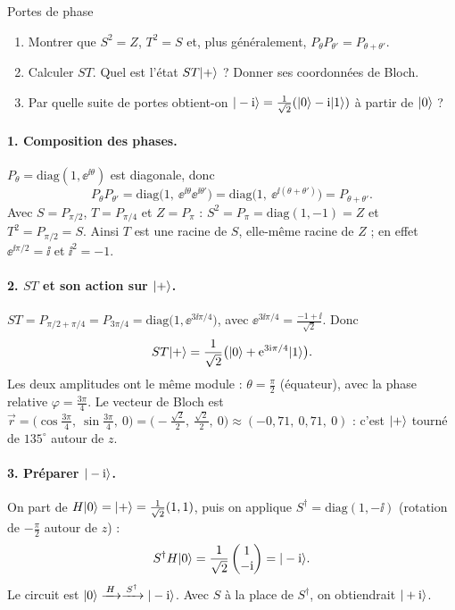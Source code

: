 \begin{exercice}{Portes de phase}\label{ex:phases}
\begin{enumerate}[label=\arabic*.,nosep]
  \item Montrer que $S^2=Z$, $T^2=S$ et, plus généralement, $P_\theta P_{\theta'}=P_{\theta+\theta'}$.
  \item Calculer $ST$. Quel est l'état $ST|+\rangle$ ? Donner ses coordonnées de Bloch.
  \item Par quelle suite de portes obtient-on $|-\mathrm{i}\rangle=\frac{1}{\sqrt2}(|0\rangle-\mathrm{i}|1\rangle)$ à partir
        de $|0\rangle$ ?
\end{enumerate}
\end{exercice}
\begin{correction}
\paragraph{1. Composition des phases.} $P_\theta=\mathrm{diag}(1,\ee^{\ii\theta})$ est diagonale, donc
\[
  P_\theta P_{\theta'}=\mathrm{diag}\big(1,\ \ee^{\ii\theta}\ee^{\ii\theta'}\big)=\mathrm{diag}\big(1,\ \ee^{\ii(\theta+\theta')}\big)
  =P_{\theta+\theta'} .
\]
Avec $S=P_{\pi/2}$, $T=P_{\pi/4}$ et $Z=P_\pi$ : $S^2=P_\pi=\mathrm{diag}(1,-1)=Z$ et
$T^2=P_{\pi/2}=S$. Ainsi $T$ est une racine de $S$, elle-même racine de $Z$ ; en effet
$\ee^{\ii\pi/2}=\ii$ et $\ii^2=-1$.

\paragraph{2. $ST$ et son action sur $|+\rangle$.} $ST=P_{\pi/2+\pi/4}=P_{3\pi/4}
=\mathrm{diag}\big(1,\ee^{3\ii\pi/4}\big)$, avec $\ee^{3\ii\pi/4}=\frac{-1+\ii}{\sqrt2}$. Donc
\[
  ST|+\rangle=\frac{1}{\sqrt2}\big(|0\rangle+\mathrm{e}^{3\mathrm{i}\pi/4}|1\rangle\big).
\]
Les deux amplitudes ont le même module : $\theta=\frac\pi2$ (équateur), avec la phase relative
$\varphi=\frac{3\pi}{4}$. Le vecteur de Bloch est
$\vec r=\big(\cos\tfrac{3\pi}4,\ \sin\tfrac{3\pi}4,\ 0\big)=\big(-\tfrac{\sqrt2}{2},\ \tfrac{\sqrt2}{2},\ 0\big)
\approx(-0{,}71,\ 0{,}71,\ 0)$ : c'est $|+\rangle$ tourné de $135^\circ$ autour de $z$.

\paragraph{3. Préparer $|-\mathrm{i}\rangle$.} On part de $H|0\rangle=|+\rangle=\frac{1}{\sqrt2}(1,1)$, puis on applique
$S^\dagger=\mathrm{diag}(1,-\ii)$ (rotation de $-\frac\pi2$ autour de $z$) :
\[
  S^\dagger H|0\rangle=\frac{1}{\sqrt2}\begin{pmatrix}1\\-\mathrm{i}\end{pmatrix}=|-\mathrm{i}\rangle.
\]
Le circuit est $|0\rangle\xrightarrow{\,H\,}\xrightarrow{\,S^\dagger\,}|-\mathrm{i}\rangle$. Avec $S$ à la place de
$S^\dagger$, on obtiendrait $|+\mathrm{i}\rangle$.
\end{correction}

